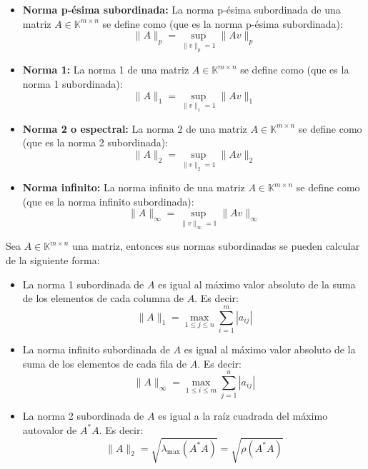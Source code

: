 \begin{itemize}
    \item \textbf{Norma p-ésima subordinada:} La norma p-ésima subordinada de una matriz $ A \in \mathbb{K}^{m \times n} $ se define como (que es la norma p-ésima subordinada):
    \[
        \|A\|_p = \sup_{\|v\|_p = 1} \|Av\|_p
    \]
    \item \textbf{Norma 1:} La norma 1 de una matriz $ A \in \mathbb{K}^{m \times n} $ se define como (que es la norma 1 subordinada):
    \[
        \|A\|_1 = \sup_{\|v\|_1 = 1} \|Av\|_1
    \]
    \item \textbf{Norma 2 o espectral:} La norma 2 de una matriz $ A \in \mathbb{K}^{m \times n} $ se define como (que es la norma 2 subordinada):
    \[
        \|A\|_2 = \sup_{\|v\|_2 = 1} \|Av\|_2
    \]
    \item \textbf{Norma infinito:} La norma infinito de una matriz $ A \in \mathbb{K}^{m \times n} $ se define como (que es la norma infinito subordinada):
    \[
        \|A\|_\infty = \sup_{\|v\|_\infty = 1} \|Av\|_\infty   
    \]
\end{itemize}

\begin{teorema}
    Sea $A \in \mathbb{K}^{m \times n}$ una matriz, entonces sus normas subordinadas se pueden calcular de la siguiente forma:
    \begin{itemize}
        \item La norma 1 subordinada de $A$ es igual al máximo valor absoluto de la suma de los elementos de cada columna de $A$. Es decir:
        \[
            \|A\|_1 = \max_{1 \leq j \leq n} \sum_{i=1}^{m} |a_{ij}|
        \]
        \item La norma infinito subordinada de $A$ es igual al máximo valor absoluto de la suma de los elementos de cada fila de $A$. Es decir:
        \[
            \|A\|_\infty = \max_{1 \leq i \leq m} \sum_{j=1}^{n} |a_{ij}|
        \]
        \item La norma 2 subordinada de $A$ es igual a la raíz cuadrada del máximo autovalor de $ A^* A $. Es decir:    
        \[
            \|A\|_2 = \sqrt{\lambda_{\max}(A^* A)} =
            \sqrt{\rho (A^*A)}
        \]
    \end{itemize}
\end{teorema}


